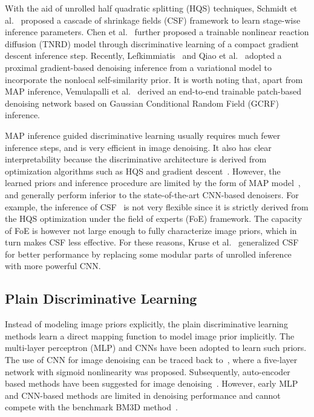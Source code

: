 \documentclass[journal]{IEEEtran}
\begin{document}
With the aid of unrolled half quadratic splitting (HQS) techniques, Schmidt et al.~\cite{schmidt2014shrinkage,tuprints6044} proposed a cascade of shrinkage fields (CSF) framework to learn stage-wise inference parameters. Chen et al.~\cite{chen2015trainable} further proposed a trainable nonlinear reaction diffusion (TNRD) model through discriminative learning of a compact gradient descent inference step. Recently, Lefkimmiatis~\cite{lefkimmiatis2016non} and Qiao et al.~\cite{Qiao2017} adopted a proximal gradient-based denoising inference from a variational model to incorporate the nonlocal self-similarity prior. {It is worth noting that, apart from MAP inference, Vemulapalli et al.~\cite{Vemulapalli_2016_CVPR} derived an end-to-end trainable patch-based denoising network based on Gaussian Conditional Random Field (GCRF) inference.}


MAP inference guided discriminative learning usually requires much fewer inference steps, and is very efficient in image denoising. It also has clear interpretability because the discriminative architecture is derived from optimization algorithms such as HQS and gradient descent~\cite{schmidt2014shrinkage,barbu2009training,samuel2009learning,sun2011learning,chen2015trainable}. However, the learned priors and inference procedure are limited by the form of MAP model~\cite{tuprints6044}, and generally perform inferior to the state-of-the-art CNN-based denoisers.
For example, the inference of CSF~\cite{schmidt2014shrinkage} is not very flexible since it is strictly derived from the HQS optimization under the field of experts (FoE) framework. The capacity of FoE is however not large enough to fully characterize image priors, which in turn makes CSF less effective.
For these reasons, Kruse et al.~\cite{Kruse_2017_ICCV} generalized CSF for better performance by replacing some modular parts of unrolled inference with more powerful CNN.

\vspace{-0.2cm}
\subsection{Plain Discriminative Learning}

Instead of modeling image priors explicitly, the plain discriminative learning methods learn a direct mapping function to model image prior implicitly. The multi-layer perceptron (MLP) and CNNs have been adopted to learn such priors.
The use of CNN for image denoising can be traced back to~\cite{jain2009natural}, where a five-layer network with sigmoid nonlinearity was proposed. Subsequently, auto-encoder based methods have been suggested for image denoising~\cite{xie2012image,agostinelli2013robust}.
However, early MLP and CNN-based methods are limited in denoising performance and cannot compete with the benchmark BM3D method~\cite{dabov2007image}.
\end{document}
